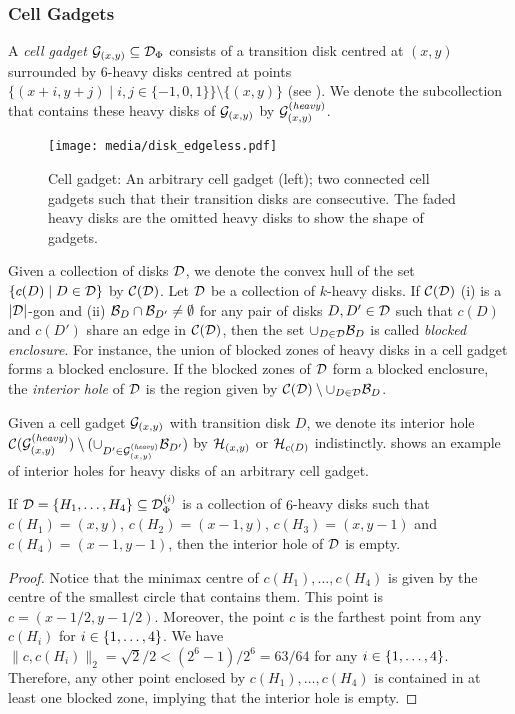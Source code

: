 \begin{toappendix}
\begin{toappendix}
\subsubsection{Cell Gadgets}

A \emph{cell gadget} $\mathcal{G}_{(x,y)}\subseteq \mathcal{D}_\Phi$ consists of a transition disk centred at $(x,y)$ surrounded by $6$-heavy disks centred at points $\{(x+i,y+j)\mid i,j\in \{-1,0,1\}\}\setminus\{(x,y)\}$ (see ). We denote the subcollection that contains these heavy disks of $\mathcal{G}_{(x,y)}$ by $\mathcal{G}_{(x,y)}^{(\mathit{heavy})}$.

\begin{figure}[!b]
    \centering
    \texttt{[image: media/disk\_edgeless.pdf]}
    \caption{Cell gadget: An arbitrary cell gadget (left); two connected cell gadgets such that their transition disks are consecutive. The faded heavy disks are the omitted heavy disks to show the shape of gadgets.}
    \label{fig:cell_gadget}
\end{figure}

Given a collection of disks $\mathcal{D}$, we denote the convex hull of the set $\{c(D)\mid D\in \mathcal{D}\}$ by $\mathcal{C}(\mathcal{D})$.
Let $\mathcal{D}$ be a collection of $k$-heavy disks. If $\mathcal{C}(\mathcal{D})$ (i) is a $|\mathcal{D}|$-gon and (ii) $\mathcal{B}_{D}\cap \mathcal{B}_{D'} \neq \emptyset$ for any pair of disks $D,D' \in \mathcal{D}$ such that $c(D)$ and $c(D')$ share an edge in $\mathcal{C}(\mathcal{D})$, then the set $\cup_{D\in\mathcal{D}} \mathcal{B}_D $ is called \emph{blocked enclosure}.
For instance, the union of blocked zones of heavy disks in a cell gadget forms a blocked enclosure.
If the blocked zones of $\mathcal{D}$ form a blocked enclosure, the \emph{interior hole} of $\mathcal{D}$ is the region given by $\mathcal{C}(\mathcal{D}) \setminus \cup_{D\in\mathcal{D}} \mathcal{B}_D$.

Given a cell gadget $\mathcal{G}_{(x,y)}$ with transition disk $D$, we denote its interior hole $\mathcal{C}(\mathcal{G}_{(x,y)}^{(\mathit{heavy})})\setminus (\cup_{D' \in \mathcal{G}_{(x,y)}^{(\mathit{heavy})}} \mathcal{B}_{D'})$ by $\mathcal{H}_{(x,y)}$ or $\mathcal{H}_{c(D)}$ indistinctly.  shows an example of interior holes for heavy disks of an arbitrary cell gadget.

\begin{mlemmarep}\label{lem:no_holes_hd_squares}
    If $\mathcal{D} = \{H_1,\ldots,H_4\} \subseteq \mathcal{D}^{(i)}_\Phi$ is a collection of $6$-heavy disks such that $c(H_1) = (x,y)$, $c(H_2) = (x-1,y)$, $c(H_3) = (x,y-1)$ and $c(H_4) = (x-1,y-1)$, then the interior hole of $\mathcal{D}$ is empty.
\end{mlemmarep}
\begin{proof}
    Notice that the minimax centre of $c(H_1),\ldots,c(H_4)$ is given by the centre of the smallest circle that contains them. 
    This point is $c = (x-1/2,y-1/2)$.
    Moreover, the point $c$ is the farthest point from any $c(H_i)$ for $i\in \{1,\ldots,4\}$.
    We have $\lVert c, c(H_i)\rVert_2 = \sqrt{2}/2 < (2^6 - 1 )/2^6 = 63/64$ for any $i \in \{1,\ldots,4\}$.
    Therefore, any other point enclosed by $c(H_1),\ldots,c(H_4)$ is contained in at least one blocked zone, implying that the interior hole is empty.
\end{proof}


\end{toappendix}
\end{toappendix}
